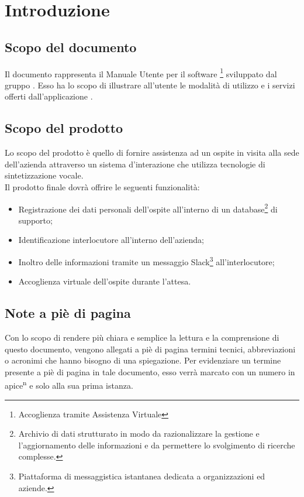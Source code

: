 \documentclass[../ManualeUtente_v1.0.0.tex]{subfiles}
\begin{document}
\section{Introduzione}

	\subsection{Scopo del documento}
	Il documento rappresenta il Manuale Utente per il software {\progetto}\footnote[1]{Accoglienza tramite Assistenza Virtuale} sviluppato dal gruppo \kpanic. Esso ha lo scopo di illustrare all'utente le modalità di utilizzo e i servizi offerti dall'applicazione \progetto.
	
	\subsection{Scopo del prodotto}
	Lo scopo del prodotto è quello di fornire assistenza ad un ospite in visita alla sede dell'azienda attraverso un sistema d'interazione che utilizza tecnologie di sintetizzazione vocale.
	\\Il prodotto finale dovrà offrire le seguenti funzionalità:
	\begin{itemize}
		\item Registrazione dei dati personali dell'ospite all'interno di un {database}\footnote[2]{Archivio di dati strutturato in modo da razionalizzare la gestione e l’aggiornamento delle informazioni e da permettere lo svolgimento di ricerche complesse.} di supporto;
		\item Identificazione interlocutore all'interno dell'azienda;
		\item Inoltro delle informazioni tramite un messaggio {Slack}\footnote[3]{
Piattaforma di messaggistica istantanea dedicata a organizzazioni ed aziende.} all'interlocutore;
		\item Accoglienza virtuale dell'ospite durante l'attesa.
	\end{itemize}

	\subsection{Note a piè di pagina}
	Con lo scopo di rendere più chiara e semplice la lettura e la comprensione di questo documento, vengono allegati a piè di pagina termini tecnici, abbreviazioni o acronimi che hanno bisogno di una spiegazione. Per evidenziare un termine presente a piè di pagina in tale documento, esso verrà marcato con un numero in apice\textsuperscript{n} e solo alla sua prima istanza.
\end{document}
